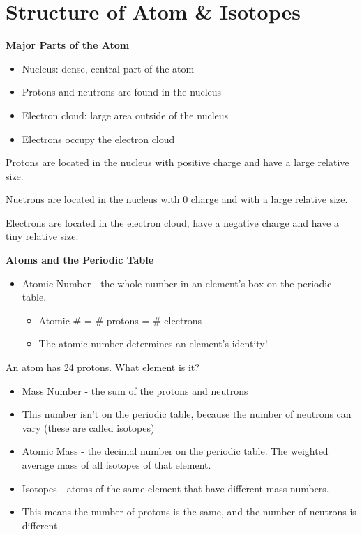 \documentclass[../hchem.tex]{subfiles}
\begin{document}
\section{Structure of Atom \& Isotopes}
\textbf{Major Parts of the Atom}
\begin{itemize}
    \item Nucleus: dense, central part of the atom 
    \item Protons and neutrons are found in the nucleus
    
    \item Electron cloud: large area outside of the nucleus 
    \item Electrons occupy the electron cloud
\end{itemize}

Protons are located in the nucleus with positive charge and have a large relative size.

Nuetrons are located in the nucleus with 0 charge and with a large relative size.

Electrons are located in the electron cloud, have a negative charge and have a tiny relative size.

\textbf{Atoms and the Periodic Table}
\begin{itemize}
    \item Atomic Number - the whole number in an element's box on the periodic table.
    \begin{itemize}
        \item Atomic \# = \# protons = \# electrons 
        \item The atomic number determines an element's identity!
    \end{itemize}
\end{itemize}

\ex An atom has 24 protons. What element is it? 

\begin{itemize}
    \item Mass Number - the sum of the protons and neutrons 
    \item This number isn't on the periodic table, because the number of neutrons can vary (these are called isotopes)
    
    \item Atomic Mass - the decimal number on the periodic table. The weighted average mass of all isotopes of that element. 
    
    \item Isotopes - atoms of the same element that have different mass numbers.
    \item This means the number of protons is the same, and the number of neutrons is different.
\end{itemize}
\end{document}
